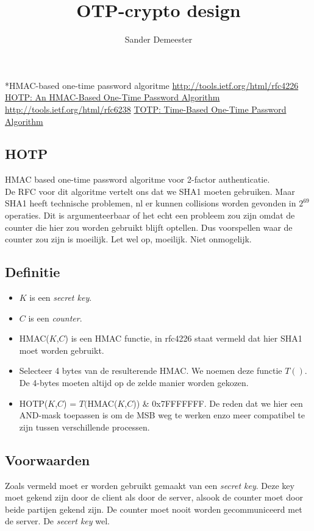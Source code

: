 \documentclass[10pt,a4paper]{report}
\author{Sander Demeester}
\title{OTP-crypto design}
\begin{document}
\begin{section}*{HMAC-based one-time password algoritme}
\url{http://tools.ietf.org/html/rfc4226}
\href{http://tools.ietf.org/html/rfc4226}{HOTP: An HMAC-Based One-Time Password Algorithm}\\
\url{http://tools.ietf.org/html/rfc6238}
\href{http://tools.ietf.org/html/rfc6238}{TOTP: Time-Based One-Time Password Algorithm}
\section*{HOTP}
HMAC based one-time password algoritme voor 2-factor authenticatie.\\
De RFC voor dit algoritme vertelt ons dat we SHA1 moeten gebruiken. Maar SHA1 heeft technische problemen, nl er kunnen collisions worden gevonden in $2^69$ operaties. Dit is argumenteerbaar of het echt een probleem zou zijn omdat de counter die hier zou worden gebruikt blijft optellen. Dus voorspellen waar de counter zou zijn is moeilijk. Let wel op, moeilijk. Niet onmogelijk. 
\subsection*{Definitie}
\begin{itemize}
\item $K$ is een \emph{secret key}.
\item $C$ is een \emph{counter}.
\item HMAC($K$,$C$) is een HMAC functie, in rfc4226 staat vermeld dat hier SHA1 moet worden gebruikt. 
\item Selecteer 4 bytes van de resulterende HMAC. We noemen deze functie $T()$. De 4-bytes moeten altijd op de zelde manier worden gekozen.
\item HOTP($K$,$C$) = $T($HMAC($K$,$C$)) \& 0x7FFFFFFF. De reden dat we hier een AND-mask toepassen is om de MSB weg te werken enzo meer compatibel te zijn tussen verschillende processen.
\end{itemize}
\subsection*{Voorwaarden}
Zoals vermeld moet er worden gebruikt gemaakt van een \emph{secret key}. Deze key moet gekend zijn door de client als door de server, alsook de counter moet door beide partijen gekend zijn. De counter moet nooit worden gecommuniceerd met de server. De \emph{secert key} wel.\\
\end{section}
\end{document}
